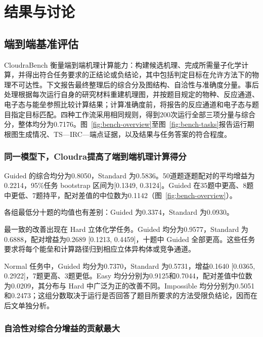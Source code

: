 \section{结果与讨论}




\subsection{端到端基准评估}

CloudraBench 衡量端到端机理计算能力：构建候选机理、完成所需量子化学计算，并得出符合任务要求的正结论或负结论，其中包括判定目标在允许方法下的物理不可达性。下文报告最终整理后的综合分及图结构、自洽性与准确度分量。事后处理根据每次运行自身的研究材料重建机理图，并按题目规定的物种、反应通道、电子态与能垒参照比较计算结果；计算准确度前，将报告的反应通道和电子态与题目指定目标匹配。四种工作流采用相同规则，得到200次运行全部三项分量与综合分，整体均分为0.7176。图~\ref{fig:bench-overview}至图~\ref{fig:bench-tasks}报告运行期根图生成情况、TS—IRC—端点证据，以及结果与任务答案的符合程度。

\subsubsection{同一模型下，Cloudra提高了端到端机理计算得分}

Guided 的综合均分为0.8050，Standard 为0.5836。50道题逐题配对的平均增益为0.2214，95\%任务 bootstrap 区间为[0.1349, 0.3124]。Guided 在35题中更高、8题中更低、7题持平，配对差值的中位数为0.1142（图~\ref{fig:bench-overview}）。

各组最低分十题的均值也有差别：Guided 为0.3374，Standard 为0.0930。

最一致的改善出现在 Hard 立体化学任务。Guided 均分为0.9577，Standard 为0.6888，配对增益为0.2689 [0.1213, 0.4459]，十题中 Guided 全部更高。这些任务要求将每个能垒和计算路径归到相应立体异构体或竞争通道。

Normal 任务中，Guided 均分为0.7370，Standard 为0.5731，增益0.1640 [0.0365, 0.2922]，7题更高、3题更低。Easy 均分分别为0.9125和0.7044，配对差值中位数为0.0209，其分布与 Hard 中广泛为正的改善不同。Impossible 均分分别为0.5051和0.2473；这组分数取决于运行是否回答了题目所要求的方法受限负结论，因而在后文单独分析。

\subsubsection{自洽性对综合分增益的贡献最大}


